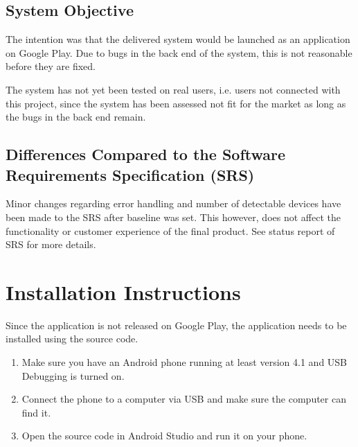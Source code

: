 \documentclass[a4paper]{article}
\begin{document}
\subsection{System Objective}
The intention was that the delivered system would be launched as an application on Google Play. Due to bugs in the back end of the system, this is not reasonable before they are fixed. 

The system has not yet been tested on real users, i.e. users not connected with this project, since the system has been assessed not fit for the market as long as the bugs in the back end remain.  

\subsection{Differences Compared to the Software Requirements Specification (SRS)}
Minor changes regarding error handling and number of detectable devices have been made to the SRS after baseline was set. This however, does not affect the functionality or customer experience of the final product. See status report of SRS for more details. 


\section{Installation Instructions}
Since the application is not released on Google Play, the application needs to be installed using the source code. 

\begin{enumerate}
\item Make sure you have an Android phone running at least version 4.1 and USB Debugging is turned on.
\item Connect the phone to a computer via USB and make sure the computer can find it.
\item Open the source code in Android Studio and run it on your phone.
\end{enumerate}
\end{document}
